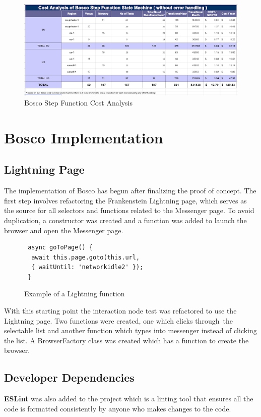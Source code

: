 \documentclass[12pt,a4paper,titlepage]{report}
\begin{document}
\begin{figure}[H]
 \centering
 \includegraphics[width=15cm]{./diagrams/sf_cost_analysis}
 \caption{Bosco Step Function Cost Analysis}
\end{figure}

\chapter{Bosco Implementation}

\section{Lightning Page}
The implementation of Bosco has begun after finalizing the proof of concept. The first step involves refactoring the Frankenstein Lightning page, which serves as the source for all selectors and functions related to the Messenger page. To avoid duplication, a constructor was created and a function was added to launch the browser and open the Messenger page.

\begin{figure}[H]
 \begin{tcolorbox}
  \begin{verbatim}
 async goToPage() {
  await this.page.goto(this.url, 
  { waitUntil: 'networkidle2' });
 }
\end{verbatim}
 \end{tcolorbox}
 \caption{Example of a Lightning function}
\end{figure}

With this starting point the interaction node test was refactored to use the Lightning page. Two functions were
created, one which clicks through the selectable list and another function which types into messenger instead of
clicking the list. A BrowserFactory class was created which has a function to create the browser.

\section{Developer Dependencies}
\textbf{ESLint} was also added to the project which is a linting tool that ensures all the code is formatted consistently
by anyone who makes changes to the code.  
\end{document}
